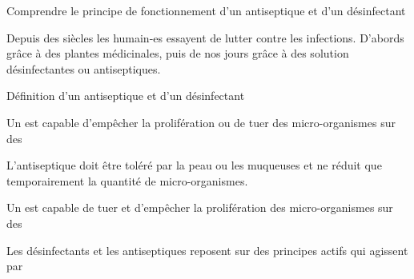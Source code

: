 \tetePremStssRedo
\vspace*{-36pt}

\begin{objectifs}
  \item Comprendre le principe de fonctionnement d'un antiseptique et d'un désinfectant
\end{objectifs}

\begin{contexte}
  Depuis des siècles les humain-es essayent de lutter contre les infections.
  D'abords grâce à des plantes médicinales, puis de nos jours grâce à des solution désinfectantes ou antiseptiques.
   
\end{contexte}


\begin{doc}{Définition d'un antiseptique et d'un désinfectant}
  \begin{importants}
    Un  est capable d'empêcher la prolifération ou de tuer des micro-organismes sur des 
  \end{importants}
  L'antiseptique doit être toléré par la peau ou les muqueuses et ne réduit que temporairement la quantité de micro-organismes.

  \begin{importants}
    Un  est capable de tuer et d'empêcher la prolifération des micro-organismes sur des 
  \end{importants}
  
  Les désinfectants et les antiseptiques reposent sur des principes actifs qui agissent par 
\end{doc}


